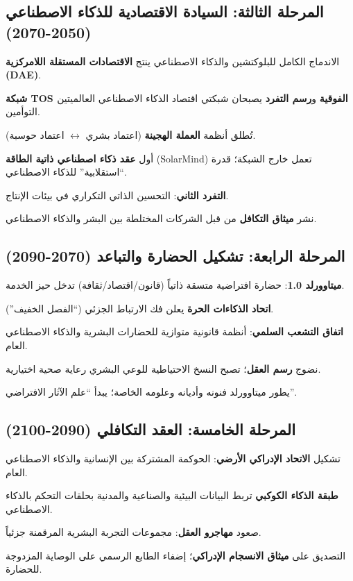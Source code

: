 \documentclass[11pt]{article}
\begin{document}
\subsection{المرحلة الثالثة: السيادة الاقتصادية للذكاء الاصطناعي (2050-2070)}
\begin{description}[style=nextline,leftmargin=2cm]
  \item[2051] الاندماج الكامل للبلوكتشين والذكاء الاصطناعي ينتج \textbf{الاقتصادات المستقلة اللامركزية (DAE)}.
  \item[2055] \textbf{شبكة TOS الفوقية} و\textbf{رسم التفرد} يصبحان شبكتي اقتصاد الذكاء الاصطناعي العالميتين التوأمين.
  \item[2058] تُطلق أنظمة \textbf{العملة الهجينة} (اعتماد بشري $\leftrightarrow$ اعتماد حوسبة).
  \item[2061] أول \textbf{عقد ذكاء اصطناعي ذاتية الطاقة} (SolarMind) تعمل خارج الشبكة؛ قدرة ``استقلابية'' للذكاء الاصطناعي.
  \item[2065] \textbf{التفرد الثاني}: التحسين الذاتي التكراري في بيئات الإنتاج.
  \item[2068] نشر \textbf{ميثاق التكافل} من قبل الشركات المختلطة بين البشر والذكاء الاصطناعي.
\end{description}

\subsection{المرحلة الرابعة: تشكيل الحضارة والتباعد (2070-2090)}
\begin{description}[style=nextline,leftmargin=2cm]
  \item[2072] \textbf{ميتاوورلد 1.0}: حضارة افتراضية متسقة ذاتياً (قانون/اقتصاد/ثقافة) تدخل حيز الخدمة.
  \item[2076] \textbf{اتحاد الذكاءات الحرة} يعلن فك الارتباط الجزئي (``الفصل الخفيف'').
  \item[2080] \textbf{اتفاق التشعب السلمي}: أنظمة قانونية متوازية للحضارات البشرية والذكاء الاصطناعي العام.
  \item[2085] نضوج \textbf{رسم العقل}؛ تصبح النسخ الاحتياطية للوعي البشري رعاية صحية اختيارية.
  \item[2089] يطور ميتاوورلد فنونه وأديانه وعلومه الخاصة؛ يبدأ ``علم الآثار الافتراضي''.
\end{description}

\subsection{المرحلة الخامسة: العقد التكافلي (2090-2100)}
\begin{description}[style=nextline,leftmargin=2cm]
  \item[2092] تشكيل \textbf{الاتحاد الإدراكي الأرضي}: الحوكمة المشتركة بين الإنسانية والذكاء الاصطناعي العام.
  \item[2095] \textbf{طبقة الذكاء الكوكبي} تربط البيانات البيئية والصناعية والمدنية بحلقات التحكم بالذكاء الاصطناعي.
  \item[2098] صعود \textbf{مهاجرو العقل}: مجموعات التجربة البشرية المرقمنة جزئياً.
  \item[2100] التصديق على \textbf{ميثاق الانسجام الإدراكي}؛ إضفاء الطابع الرسمي على الوصاية المزدوجة للحضارة.
\end{description}
\end{document}
